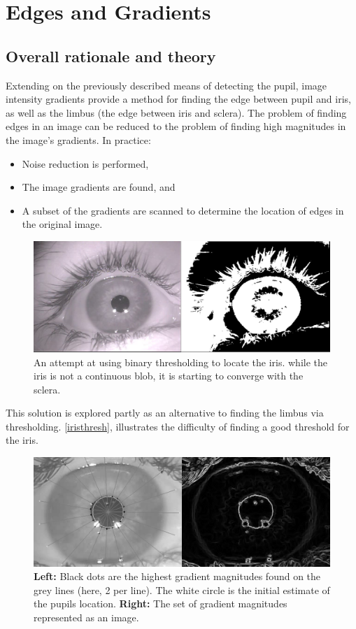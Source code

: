 \pagebreak
\section{Edges and Gradients}
\subsection{Overall rationale and theory}
Extending on the previously described means of detecting the pupil, image
intensity gradients provide a method for finding the edge between pupil and
iris, as well as the limbus (the edge between iris and sclera). The problem of
finding edges in an image can be reduced to the problem of finding high
magnitudes in the image's gradients.
In practice:
\begin{itemize}
	\item Noise reduction is performed,
	\item The image gradients are found, and
	\item A subset of the gradients are scanned to determine the location of edges in the
original image.
\end{itemize}

\label{iristhresh}
\begin{figure}[htbp]
\includegraphics{pics/iris_threshold.png}
\caption{An attempt at using binary thresholding to locate the iris.
while the iris is not a continuous blob, it is starting to converge with the sclera.}
\end{figure}

This solution is explored partly as an alternative to finding the limbus via
thresholding. \ref{iristhresh}, illustrates the difficulty of finding a good threshold for the iris. 


\begin{figure}[htbp]
\includegraphics{pics/normallines_with_maxima_vs_gradient.png}
\caption{\textbf{Left:} Black dots are the highest gradient magnitudes found on the grey
lines (here, 2 per line). The white circle is the initial estimate of the
pupils location. \textbf{Right:} The set of gradient magnitudes represented as an image.}
\end{figure}

